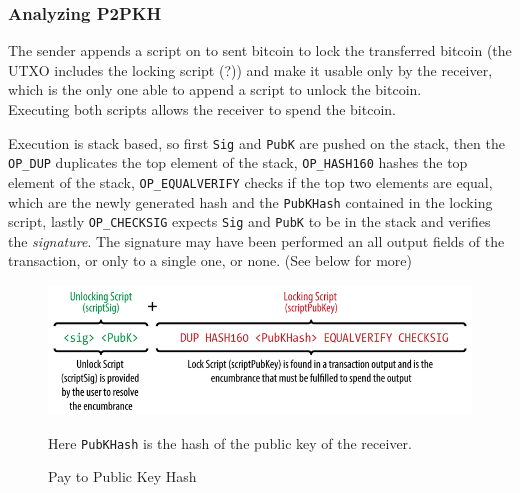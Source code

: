 \subsubsection{Analyzing P2PKH}
The sender appends a script on to sent bitcoin to lock the transferred bitcoin (the UTXO includes the locking script (?)) and make it usable only by the receiver, which is the only one able to append a script to unlock the bitcoin.\\
Executing both scripts allows the receiver to spend the bitcoin.
\begin{paracol}{2}

   Execution is stack based, so first \texttt{Sig} and \texttt{PubK} are pushed on the stack, then the \texttt{OP\_DUP} duplicates the top element of the stack, \texttt{OP\_HASH160} hashes the top element of the stack, \texttt{OP\_EQUALVERIFY} checks if the top two elements are equal, which are the newly generated hash and the \texttt{PubKHash} contained in the locking script,
   lastly \texttt{OP\_CHECKSIG} expects \texttt{Sig} and \texttt{PubK} to be in the stack and verifies the \textit{signature}.
   The signature may have been performed an all output fields of the transaction, or only to a single one, or none. (See below for more)
   
   \switchcolumn
   \colfill
   \begin{figure}[htbp]
      \centering
      \includegraphics{images/bitcoin_p2pkh.png}
      \caption{Pay to Public Key Hash}
      Here \texttt{PubKHash} is the hash of the public key of the receiver.
      \label{fig:bitcoin_p2pkh}
   \end{figure}
   \colfill
   
\end{paracol}

